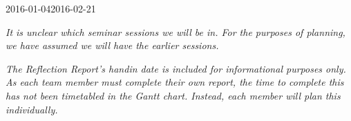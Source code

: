 \documentclass{article}
\begin{document}
\begin{landscape}
\begin{flushright}
\begin{ganttchart}[
		hgrid,
		vgrid,
		x unit=4mm,
		y unit chart=.7cm,
		time slot format=isodate
	]{2016-01-04}{2016-02-21}
	 \\
\end{ganttchart}

\end{flushright}

\textit{It is unclear which seminar sessions we will be in. For the purposes of planning, we have
assumed we will have the earlier sessions.}

\textit{The Reflection Report's handin date is included for informational purposes only.
As each team member must complete their own report, the time to complete this has
not been timetabled in the Gantt chart. Instead, each member will plan this individually.}

\end{landscape}
\end{document}
